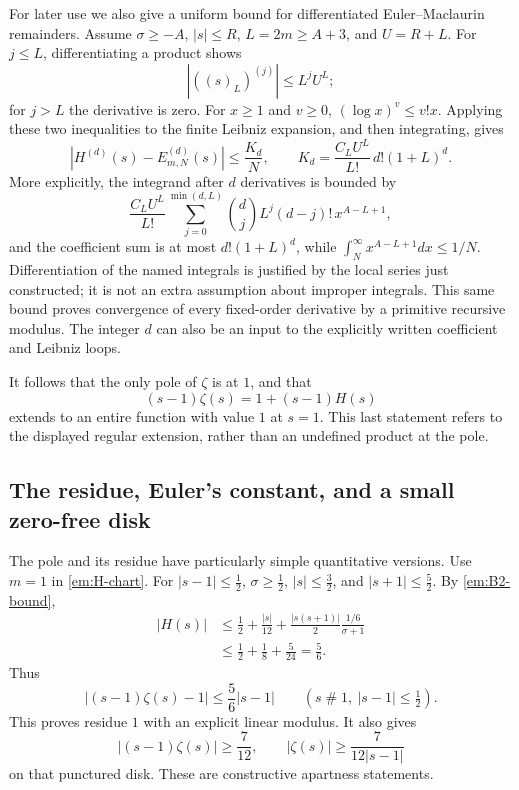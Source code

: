 For later use we also give a uniform bound for differentiated
Euler--Maclaurin remainders.  Assume $\sigma\geq-A$, $|s|\leq R$,
$L=2m\geq A+3$, and $U=R+L$.  For $j\leq L$, differentiating a product
shows
\[
 |((s)_L)^{(j)}|\leq L^jU^L;
\]
for $j>L$ the derivative is zero.  For $x\geq1$ and $v\geq0$,
$(\log x)^v\leq v!x$.  Applying these two inequalities to the finite
Leibniz expansion, and then integrating, gives
\begin{equation}
 \left|H^{(d)}(s)-E_{m,N}^{(d)}(s)\right|
 \leq\frac{K_d}{N},\qquad
 K_d=\frac{C_L U^L}{L!}\,d!(1+L)^d.
 \label{em:derivative-tail}
\end{equation}
More explicitly, the integrand after $d$ derivatives is bounded by
\[
 \frac{C_LU^L}{L!}
 \sum_{j=0}^{\min(d,L)}\binom dj L^j(d-j)!\,x^{A-L+1},
\]
and the coefficient sum is at most $d!(1+L)^d$, while
$\int_N^\infty x^{A-L+1}dx\leq1/N$.
Differentiation of the named integrals is justified by the local series
just constructed; it is not an extra assumption about improper
integrals.  This same bound proves convergence of every fixed-order
derivative by a primitive recursive modulus.  The integer $d$ can also
be an input to the explicitly written coefficient and Leibniz loops.

It follows that the only pole of $\zeta$ is at $1$, and that
\[
 (s-1)\zeta(s)=1+(s-1)H(s)
\]
extends to an entire function with value $1$ at $s=1$.
This last statement refers to the displayed regular extension, rather
than an undefined product at the pole.

\subsection{The residue, Euler's constant, and a small zero-free disk}

The pole and its residue have particularly simple quantitative versions.
Use $m=1$ in \eqref{em:H-chart}.  For $|s-1|\leq\tfrac12$,
$\sigma\geq\tfrac12$, $|s|\leq\tfrac32$, and $|s+1|\leq\tfrac52$.
By \eqref{em:B2-bound},
\begin{align*}
 |H(s)|
 &\leq\frac12+\frac{|s|}{12}
       +\frac{|s(s+1)|}{2}
                  \frac{1/6}{\sigma+1}\\
 &\leq\frac12+\frac18+\frac5{24}=\frac56.
\end{align*}
Thus
\begin{equation}
 \left|(s-1)\zeta(s)-1\right|
       \leq\frac56|s-1|\qquad
       (s\mathrel{\#}1,\ |s-1|\leq\tfrac12).
 \label{em:residue-modulus}
\end{equation}
This proves residue $1$ with an explicit linear modulus.  It also gives
\begin{equation}
 |(s-1)\zeta(s)|\geq\frac7{12},
 \qquad |\zeta(s)|\geq\frac7{12|s-1|}
 \label{em:pole-zero-free}
\end{equation}
on that punctured disk.  These are constructive apartness statements.


